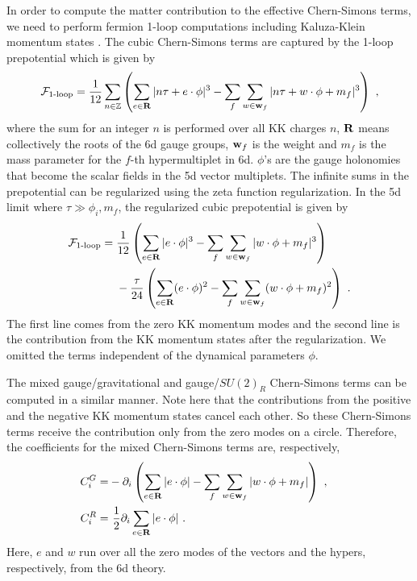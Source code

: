 In order to compute the matter contribution to the effective Chern-Simons terms, we need to perform fermion 1-loop computations including Kaluza-Klein momentum states \cite{Bonetti:2011mw,Bonetti:2013ela,Grimm:2015zea}. The cubic Chern-Simons terms are captured by the 1-loop prepotential which is given by
\begin{equation}
	\mathcal{F}_{\text{1-loop}} = \frac{1}{12}\sum_{n \in \mathbb{Z}}\left(\sum_{e \in{\bf R}} |n\tau + e\cdot \phi|^3 - \sum_f \sum_{w\in {\bf w}_f}|n\tau + w\cdot \phi + m_f|^3\right) \ ,
\end{equation}
where the sum for an integer $n$ is performed over all KK charges $n$, ${\bf R}$ means collectively the roots of the 6d gauge groups, ${\bf w}_f$ is the weight and $m_f$ is the mass parameter for the $f$-th hypermultiplet in 6d. $\phi$'s are the gauge holonomies that become the scalar fields in the 5d vector multiplets. The infinite sums in the prepotential can be regularized using the zeta function regularization. In the 5d limit where $\tau\gg \phi_i,m_f$, the regularized cubic prepotential is given by \cite{Bonetti:2013ela,Grimm:2015zea}
\begin{align}
	\mathcal{F}_{\text{1-loop}} &= \frac{1}{12}\left(\sum_{e \in {\bf R}}|e\cdot \phi|^3 - \sum_f \sum_{w\in{\bf w}_f} |w\cdot \phi + m_f|^3\right) \nonumber \\
	& \ \ \ \ - \frac{\tau}{24}\left(\sum_{e \in {\bf R}}(e\cdot \phi)^2 - \sum_f \sum_{w\in{\bf w}_f} (w \cdot \phi + m_f)^2\right) \ .
\end{align}
The first line comes from the zero KK momentum modes and the second line is the contribution from the KK momentum states after the regularization. We omitted the terms independent of the dynamical parameters $\phi$. 

The mixed gauge/gravitational and gauge/$SU(2)_R$ Chern-Simons terms can be computed in a similar manner. Note here that the contributions from the positive and the negative KK momentum states cancel each other. So these Chern-Simons terms receive the contribution only from the zero modes on a circle.
Therefore, the coefficients for the mixed Chern-Simons terms are, respectively, \cite{Bonetti:2013ela,Grimm:2015zea}
\begin{align}
	C^G_i =& -\partial_i\left(\sum_{e\in {\bf R}}|e\cdot \phi| - \sum_f\sum_{w\in{\bf w}_f}|w\cdot\phi+m_f|\right) \ , \crcr
	C^R_i =&~ \frac{1}{2} \partial_i \sum_{e\in {\bf R}}|e\cdot \phi| \ .
\end{align}
Here, $e$ and $w$ run over all the zero modes of the vectors and the hypers, respectively, from the 6d theory.

